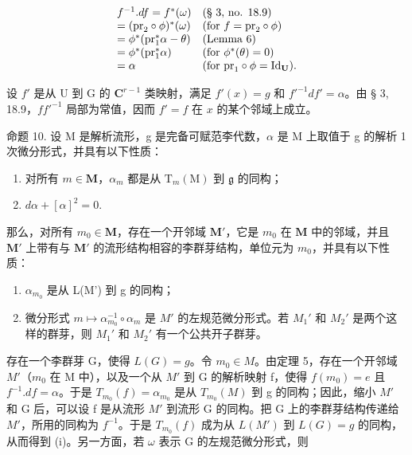 \[
\begin{array}{l l} f ^ {- 1}. d f = f ^ {*} (\omega) & \text {(§ 3, no. 18.9)} \\ = (\mathrm{pr} _ {2} \circ \phi) ^ {*} (\omega) & \text {(for \(f = \mathrm{pr} _ {2} \circ \phi\))} \\ = \phi^ {*} (\mathrm{pr} _ {1} ^ {*} \alpha - \theta) & \text {(Lemma 6)} \\ = \phi^ {*} (\mathrm{pr} _ {1} ^ {*} \alpha) & \text {(for \(\phi^ {*} (\theta) = 0\))} \\ = \alpha & \text {(for \(\mathrm{pr} _ {1} \circ \phi = \mathrm{Id} _ {\mathbf {U}}\))}. \end{array}
\]

设 \(f'\) 是从 U 到 G 的 \(\mathbf{C}^{r-1}\) 类映射，满足 \(f'(x) = g\) 和 \(f'^{-1}df' = \alpha\)。由 § 3, 18.9，\(ff'^{-1}\) 局部为常值，因而 \(f' = f\) 在 \(x\) 的某个邻域上成立。

命题 10. 设 M 是解析流形，g 是完备可赋范李代数，\(\alpha\) 是 M 上取值于 g 的解析 1 次微分形式，并具有以下性质：

\begin{enumerate}
\def\labelenumi{(\alph{enumi})}
\item
  对所有 \(m \in \mathbf{M}\)，\(\alpha_{m}\) 都是从 \(\mathrm{T}_{m}(\mathrm{M})\) 到 \(\mathfrak{g}\) 的同构；
\item
  \(d\alpha + [\alpha]^{2} = 0.\)
\end{enumerate}

那么，对所有 \(m_0 \in \mathbf{M}\)，存在一个开邻域 \(\mathbf{M}'\)，它是 \(m_0\) 在 \(\mathbf{M}\) 中的邻域，并且 \(\mathbf{M}'\) 上带有与 \(\mathbf{M}'\) 的流形结构相容的李群芽结构，单位元为 \(m_0\)，并具有以下性质：

\begin{enumerate}
\def\labelenumi{(\roman{enumi})}
\item
  \(\alpha_{m_{0}}\) 是从 L(M') 到 g 的同构；
\item
  微分形式 \(m \mapsto \alpha_{m_0}^{-1} \circ \alpha_m\) 是 \(M'\) 的左规范微分形式。若 \(M_1'\) 和 \(M_2'\) 是两个这样的群芽，则 \(M_1'\) 和 \(M_2'\) 有一个公共开子群芽。
\end{enumerate}

存在一个李群芽 G，使得 \(L(G) = g\)。令 \(m_{0} \in M\)。由定理 5，存在一个开邻域 \(M'\)（\(m_{0}\) 在 M 中），以及一个从 \(M'\) 到 G 的解析映射 f，使得 \(f(m_{0}) = e\) 且 \(f^{-1}.df = \alpha\)。于是 \(T_{m_{0}}(f) = \alpha_{m_{0}}\) 是从 \(T_{m_{0}}(M)\) 到 g 的同构；因此，缩小 \(M'\) 和 G 后，可以设 f 是从流形 \(M'\) 到流形 G 的同构。把 G 上的李群芽结构传递给 \(M'\)，所用的同构为 \(f^{-1}\)。于是 \(T_{m_{0}}(f)\) 成为从 \(L(M')\) 到 \(L(G) = g\) 的同构，从而得到 (i)。另一方面，若 \(\omega\) 表示 G 的左规范微分形式，则

